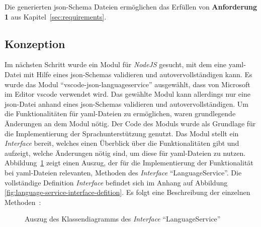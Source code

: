 Die generierten \ac{json}-Schema Dateien ermöglichen das Erfüllen von \textbf{Anforderung 1} aus Kapitel~\ref{sec:requirements}.

\subsection{Konzeption}

Im nächsten Schritt wurde ein Modul für \textit{NodeJS} gesucht, mit dem eine \ac{yaml}-Datei mit Hilfe eines \ac{json}-Schemas validieren
und autovervollständigen kann. Es wurde das Modul ``vscode-json-languageservice'' ausgewählt, dass von Microsoft im Editor \ac{vscode} verwendet
wird. Das gewählte Modul kann allerdings nur eine \ac{json}-Datei anhand eines \ac{json}-Schemas validieren
und autovervollständigen. Um die Funktionalitäten für \ac{yaml}-Dateien zu ermöglichen, waren grundlegende Änderungen an dem Modul nötig.
Der Code des Moduls wurde als Grundlage für die Implementierung der Sprachunterstützung genutzt.
Das Modul stellt ein \textit{Interface} bereit, welches einen Überblick über die Funktionalitäten gibt und aufzeigt, welche Änderungen
nötig sind, um diese für \ac{yaml}-Dateien zu nutzen.
\\
Abbildung~\ref{fig:language-service-interface-defition-excerpt} zeigt einen Auszug, der für die Implementierung
der Funktionalität bei \ac{yaml}-Dateien relevanten, Methoden des \textit{Interface} ``LanguageService''.
Die vollständige Definition \textit{Interface} befindet sich im Anhang auf Abbildung \ref{fig:language-service-interface-defition}.
Es folgt eine Beschreibung der einzelnen Methoden~\cite{vscode-json-language-service}:

\begin{figure}[htp] %
  \centering
  \caption{Auszug des Klassendiagramms des \textit{Interface} ``LanguageService''}
  \label{fig:language-service-interface-defition-excerpt}
\end{figure}


